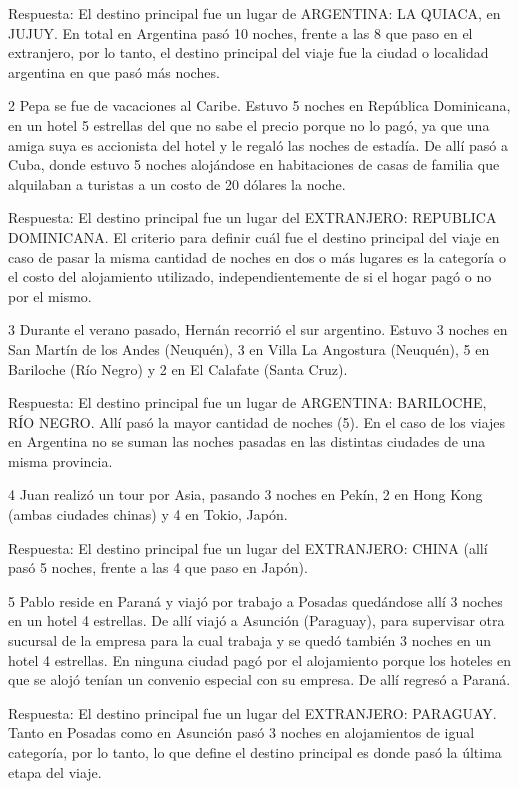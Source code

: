 \documentclass[
  openany]{book}
\begin{document}
Respuesta: El destino principal fue un lugar de ARGENTINA: LA QUIACA, en JUJUY. En total en Argentina pasó 10 noches, frente a las 8 que paso en el extranjero, por lo tanto, el destino principal del viaje fue la ciudad o localidad argentina en que pasó más noches.

2 Pepa se fue de vacaciones al Caribe. Estuvo 5 noches en República Dominicana, en un hotel 5 estrellas del que no sabe el precio porque no lo pagó, ya que una amiga suya es accionista del hotel y le regaló las noches de estadía. De allí pasó a Cuba, donde estuvo 5 noches alojándose en habitaciones de casas de familia que alquilaban a turistas a un costo de 20 dólares la noche.

Respuesta: El destino principal fue un lugar del EXTRANJERO: REPUBLICA DOMINICANA. El criterio para definir cuál fue el destino principal del viaje en caso de pasar la misma cantidad de noches en dos o más lugares es la categoría o el costo del alojamiento utilizado, independientemente de si el hogar pagó o no por el mismo.

3 Durante el verano pasado, Hernán recorrió el sur argentino. Estuvo 3 noches en San Martín de los Andes (Neuquén), 3 en Villa La Angostura (Neuquén), 5 en Bariloche (Río Negro) y 2 en El Calafate (Santa Cruz).

Respuesta: El destino principal fue un lugar de ARGENTINA: BARILOCHE, RÍO NEGRO. Allí pasó la mayor cantidad de noches (5). En el caso de los viajes en Argentina no se suman las noches pasadas en las distintas ciudades de una misma provincia.

4 Juan realizó un tour por Asia, pasando 3 noches en Pekín, 2 en Hong Kong (ambas ciudades chinas) y 4 en Tokio, Japón.

Respuesta: El destino principal fue un lugar del EXTRANJERO: CHINA (allí pasó 5 noches, frente a las 4 que paso en Japón).

5 Pablo reside en Paraná y viajó por trabajo a Posadas quedándose allí 3 noches en un hotel 4 estrellas. De allí viajó a Asunción (Paraguay), para supervisar otra sucursal de la empresa para la cual trabaja y se quedó también 3 noches en un hotel 4 estrellas. En ninguna ciudad pagó por el alojamiento porque los hoteles en que se alojó tenían un convenio especial con su empresa. De allí regresó a Paraná.

Respuesta: El destino principal fue un lugar del EXTRANJERO: PARAGUAY. Tanto en Posadas como en Asunción pasó 3 noches en alojamientos de igual categoría, por lo tanto, lo que define el destino principal es donde pasó la última etapa del viaje.
\end{document}
